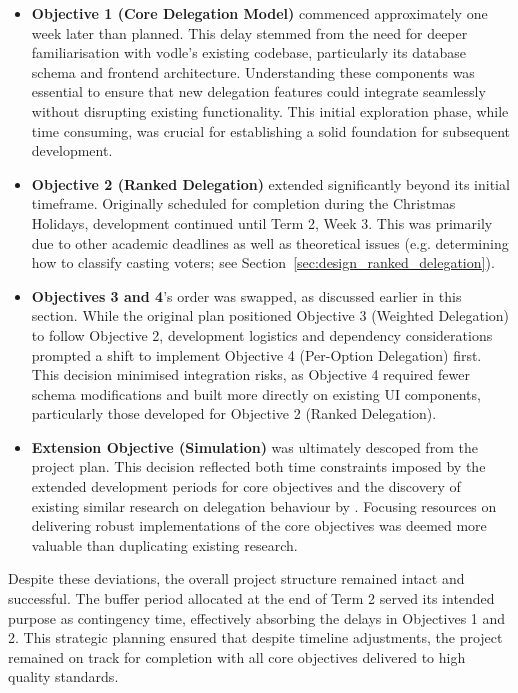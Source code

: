 \begin{itemize}
    \item \textbf{Objective 1 (Core Delegation Model)} commenced approximately one week later than planned. This delay stemmed from the need for deeper familiarisation with vodle's existing codebase, particularly its database schema and frontend architecture. Understanding these components was essential to ensure that new delegation features could integrate seamlessly without disrupting existing functionality. This initial exploration phase, while time consuming, was crucial for establishing a solid foundation for subsequent development.
    \item \textbf{Objective 2 (Ranked Delegation)} extended significantly beyond its initial timeframe. Originally scheduled for completion during the Christmas Holidays, development continued until Term 2, Week 3. This was primarily due to other academic deadlines as well as theoretical issues (e.g. determining how to classify casting voters; see Section~\ref{sec:design_ranked_delegation}).
    \item \textbf{Objectives 3 and 4}'s order was swapped, as discussed earlier in this section. While the original plan positioned Objective 3 (Weighted Delegation) to follow Objective 2, development logistics and dependency considerations prompted a shift to implement Objective 4 (Per-Option Delegation) first. This decision minimised integration risks, as Objective 4 required fewer schema modifications and built more directly on existing UI components, particularly those developed for Objective 2 (Ranked Delegation).
    \item \textbf{Extension Objective (Simulation)} was ultimately descoped from the project plan. This decision reflected both time constraints imposed by the extended development periods for core objectives and the discovery of existing similar research on delegation behaviour by \citet{brill_liquid_2022}. Focusing resources on delivering robust implementations of the core objectives was deemed more valuable than duplicating existing research.
\end{itemize}

Despite these deviations, the overall project structure remained intact and successful. The buffer period allocated at the end of Term 2 served its intended purpose as contingency time, effectively absorbing the delays in Objectives 1 and 2. This strategic planning ensured that despite timeline adjustments, the project remained on track for completion with all core objectives delivered to high quality standards.


